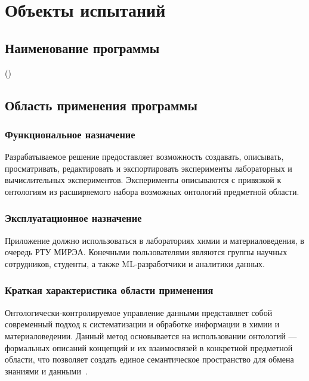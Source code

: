 \documentclass[a4paper,12pt,reqno]{article}
\begin{document}
    \project{\unskip}

    \firstPage
    \newpage
    \secondPage
    \newpage
    \thirdPage
    \newpage

    \section{Объекты испытаний}

    \subsection{Наименование программы}
     (\unskip)

    \subsection{Область применения программы}

    \subsubsection{Функциональное назначение}
    Разрабатываемое решение предоставляет возможность создавать, описывать, просматривать, редактировать и экспортировать эксперименты лабораторных и вычислительных экспериментов. Эксперименты описываются с привязкой к онтологиям из расширяемого набора возможных онтологий предметной области.

    \subsubsection{Эксплуатационное назначение}
    Приложение должно использоваться в лабораториях химии и материаловедения, в очередь РТУ МИРЭА. Конечными пользователями являются группы научных сотрудников, студенты, а также ML-разработчики и аналитики данных.

    \subsubsection{Краткая характеристика области применения}
    Онтологически-контролируемое управление данными представляет собой современный подход к систематизации и обработке информации в химии и материаловедении. Данный метод основывается на использовании онтологий — формальных описаний концепций и их взаимосвязей в конкретной предметной области, что позволяет создать единое семантическое пространство для обмена знаниями и данными~\cite{ontology:base}.
\end{document}
